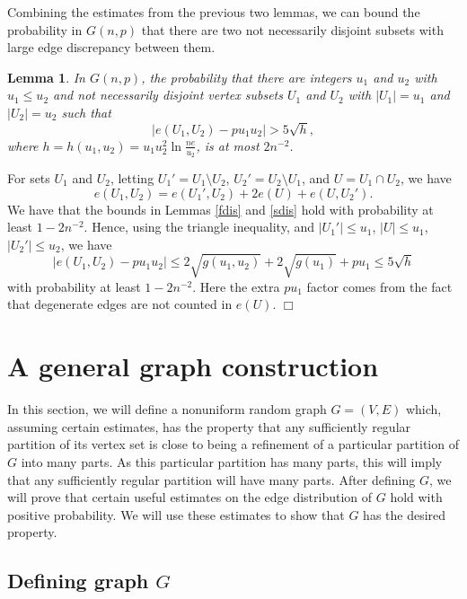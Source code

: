 \documentclass[11pt]{article}
\newtheorem{lemma}{Lemma}[section]
\newenvironment{proof}
      {\medskip\noindent{\bf Proof:}\hspace{1mm}}
      {\hfill$\Box$\medskip}
\begin{document}
Combining the estimates from the previous two lemmas, we can bound the
probability in $G(n,p)$ that there are two not necessarily disjoint subsets
with large edge discrepancy between them.

\begin{lemma}\label{gnpedge}
In $G(n,p)$, the probability that there are integers $u_1$ and $u_2$ with $u_1
\leq u_2$ and  not necessarily disjoint vertex subsets $U_1$ and $U_2$ with
$|U_1|=u_1$ and $|U_2|=u_2$ such that
\begin{equation}\label{discrep12} |e(U_1,U_2)-pu_1u_2|
> 5\sqrt{h},\end{equation}
where  $h=h(u_1,u_2)=u_1u_2^2\ln \frac{ne}{u_2}$, is at most $2 n^{-2}$.
\end{lemma}
\begin{proof}
For sets $U_1$ and $U_2$, letting $U_1'=U_1 \setminus U_2$, $U_2'=U_2 \setminus
U_1$, and
$U=U_1 \cap U_2$, we have $$e(U_1,U_2)=e(U_1',U_2)+2e(U)+e(U,U_2').$$
We have that the bounds in Lemmas \ref{fdis} and \ref{sdis} hold with
probability at
least $1 - 2n^{-2}$.
Hence, using the triangle inequality, and $|U_1'| \leq u_1$, $|U| \leq u_1$,
 $|U_2'| \leq u_2$, we have
$$|e(U_1,U_2)-pu_1u_2| \leq 2\sqrt{g(u_1,u_2)}+2\sqrt{g(u_1)} +pu_1\leq
5\sqrt{h}$$
with probability at least $1 - 2n^{-2}$. Here the extra $p u_1$ factor comes
from the fact that degenerate edges are not counted in $e(U)$.
\end{proof}

\section{A general graph construction} \label{IrregularSection}

In this section, we will define a nonuniform random graph $G=(V,E)$ which,
assuming certain estimates, has the property that any sufficiently regular
partition of its vertex set is close to being a refinement of a particular
partition of $G$ into many parts. As this particular partition has many parts,
this will imply that any sufficiently regular partition will have many parts.
After defining $G$, we will prove that certain useful estimates on the edge
distribution of $G$ hold with positive probability. We will use these estimates
to show that $G$ has the desired property.

\subsection{Defining graph $G$}
\end{document}
